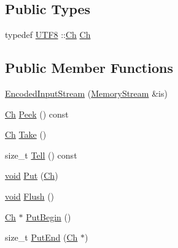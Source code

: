 \subsection*{Public Types}
\begin{DoxyCompactItemize}
\item 
typedef \hyperlink{structUTF8}{U\+T\+F8} \+::\hyperlink{classEncodedInputStream_3_01UTF8_3_4_00_01MemoryStream_01_4_a091eb31dd2554bf10054148953f9b3bf}{Ch} \hyperlink{classEncodedInputStream_3_01UTF8_3_4_00_01MemoryStream_01_4_a091eb31dd2554bf10054148953f9b3bf}{Ch}
\end{DoxyCompactItemize}
\subsection*{Public Member Functions}
\begin{DoxyCompactItemize}
\item 
\hyperlink{classEncodedInputStream_3_01UTF8_3_4_00_01MemoryStream_01_4_a45ae1fa4f5bb8295df234fa3ac91ddef}{Encoded\+Input\+Stream} (\hyperlink{structMemoryStream}{Memory\+Stream} \&is)
\item 
\hyperlink{classEncodedInputStream_3_01UTF8_3_4_00_01MemoryStream_01_4_a091eb31dd2554bf10054148953f9b3bf}{Ch} \hyperlink{classEncodedInputStream_3_01UTF8_3_4_00_01MemoryStream_01_4_aea936f1f1042f3b759cb95bdedf769b6}{Peek} () const
\item 
\hyperlink{classEncodedInputStream_3_01UTF8_3_4_00_01MemoryStream_01_4_a091eb31dd2554bf10054148953f9b3bf}{Ch} \hyperlink{classEncodedInputStream_3_01UTF8_3_4_00_01MemoryStream_01_4_a29eeabe922bb6c7cbb5c16fe8a3a7859}{Take} ()
\item 
size\+\_\+t \hyperlink{classEncodedInputStream_3_01UTF8_3_4_00_01MemoryStream_01_4_a34ffcddbbfd66aa4ea36ad6944ac9875}{Tell} () const
\item 
\hyperlink{imgui__impl__opengl3__loader_8h_ac668e7cffd9e2e9cfee428b9b2f34fa7}{void} \hyperlink{classEncodedInputStream_3_01UTF8_3_4_00_01MemoryStream_01_4_a39fe296cfa45d7f8ef5adc0dd30036c2}{Put} (\hyperlink{classEncodedInputStream_3_01UTF8_3_4_00_01MemoryStream_01_4_a091eb31dd2554bf10054148953f9b3bf}{Ch})
\item 
\hyperlink{imgui__impl__opengl3__loader_8h_ac668e7cffd9e2e9cfee428b9b2f34fa7}{void} \hyperlink{classEncodedInputStream_3_01UTF8_3_4_00_01MemoryStream_01_4_ad911c889ebd4ded9bcf9d31ca124f9a7}{Flush} ()
\item 
\hyperlink{classEncodedInputStream_3_01UTF8_3_4_00_01MemoryStream_01_4_a091eb31dd2554bf10054148953f9b3bf}{Ch} $\ast$ \hyperlink{classEncodedInputStream_3_01UTF8_3_4_00_01MemoryStream_01_4_a3ca21c33ccc4a12fe2f806b865bd3ebd}{Put\+Begin} ()
\item 
size\+\_\+t \hyperlink{classEncodedInputStream_3_01UTF8_3_4_00_01MemoryStream_01_4_ad87990d605c72529aeb78509d5b393fb}{Put\+End} (\hyperlink{classEncodedInputStream_3_01UTF8_3_4_00_01MemoryStream_01_4_a091eb31dd2554bf10054148953f9b3bf}{Ch} $\ast$)
\end{DoxyCompactItemize}
